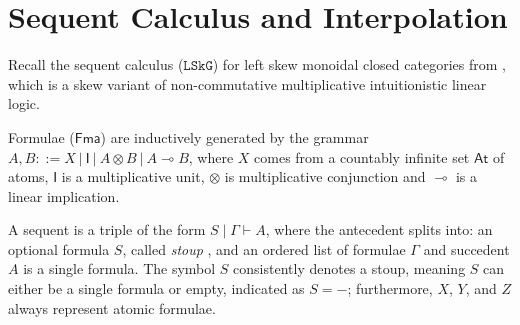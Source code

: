\documentclass[a4paper,UKenglish,cleveref, autoref, thm-restate, anonymous]{lipics-v2021}
\newcommand{\ot}{\otimes}
\newcommand{\lolli}{\multimap}
\newcommand{\I}{\mathsf{I}}
\newcommand{\vdG}{\vdash}
\newcommand{\LSkG}{$\mathtt{LSkG}$}
\newcommand{\SkBiCT}{$\mathtt{SkBiCT}$}
\newcommand{\SkBiCA}{$\mathtt{SkBiCA}$}
\newcommand{\mf}[1]{\mathsf{#1}}
\begin{document}

\section{Sequent Calculus and Interpolation}\label{sec:syntax}
Recall the sequent calculus (\LSkG) for left skew monoidal closed categories from \cite{UVW:protsn}, which is a skew variant of non-commutative multiplicative intuitionistic linear logic.

Formulae ($\mf{Fma}$) are inductively generated by the grammar $A, B::= X \ | \ \I \ | \ A \ot B \ | \ A \lolli B$, where $X$ comes from a countably infinite set $\mathsf{At}$ of atoms, $\I$ is a multiplicative unit, $\ot$ is multiplicative conjunction and $\lolli$ is a linear implication.

A sequent is a triple of the form $S \mid \Gamma \vdG A$, where the antecedent splits into: an optional formula $S$, called \emph{stoup} \cite{girard:constructive:91}, and an ordered list of formulae $\Gamma$ and succedent $A$ is a single formula.
The symbol $S$ consistently denotes a stoup, meaning $S$ can either be a single formula or empty, indicated as $S = {-}$; furthermore, $X$, $Y$, and $Z$ always represent atomic formulae.
\end{document}
